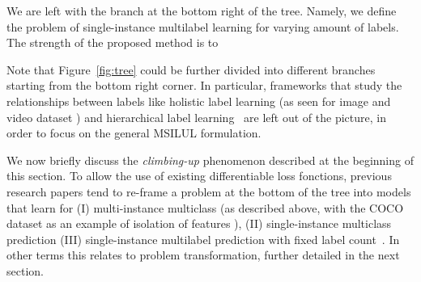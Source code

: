 We are left with the branch at the bottom right of the tree. Namely, we define the problem of single-instance multilabel learning for varying amount of labels. The strength of the proposed method is to 

Note that Figure~\ref{fig:tree} could be further divided into different branches starting from the bottom right corner. In particular, frameworks that study the relationships between labels like holistic label learning (as seen for image \cite{holisticImageDescriptors,holisticLungs} and video dataset \cite{holisticVideoData} ) and hierarchical label learning~\cite{activeLearningMultiLabel, HARAM} are left out of the picture, in order to focus on the general MSILUL formulation. 

We now briefly discuss the \emph{climbing-up} phenomenon described at the beginning of this section. To allow the use of existing differentiable loss fonctions, previous research papers tend to re-frame a problem at the bottom of the tree into models that learn for (I) multi-instance multiclass (as described above, with the COCO dataset as an example of isolation of features \cite{COCO}), (II) single-instance multiclass prediction \cite{multiclass} (III) single-instance multilabel prediction with fixed label count~\cite{threshForF1}. In other terms this relates to problem transformation, further detailed in the next section.













